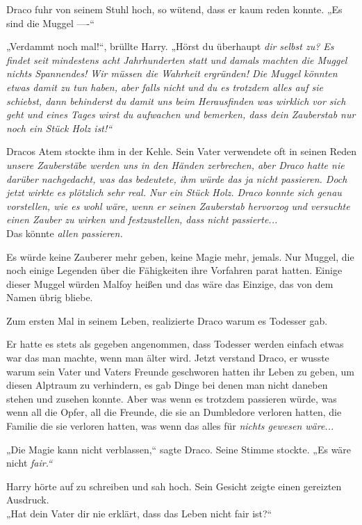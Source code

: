 {Draco fuhr von seinem Stuhl hoch, so wütend, dass er kaum reden konnte. „Es sind die Muggel ----“

„Verdammt noch mal!“, brüllte Harry. „Hörst du überhaupt \emph{dir selbst zu? Es findet seit mindestens acht Jahrhunderten statt und damals machten die Muggel nichts Spannendes! \emph{Wir müssen die Wahrheit} \emph{ergründen!} Die Muggel \emph{könnten} etwas damit zu tun haben, aber falls nicht und du es trotzdem alles auf sie schiebst, dann behinderst du damit uns beim Herausfinden was wirklich vor sich geht und eines Tages wirst du aufwachen und bemerken, dass dein Zauberstab nur noch ein Stück Holz ist!“}

Dracos Atem stockte ihm in der Kehle. Sein Vater verwendete oft in seinen Reden \emph{unsere Zauberstäbe werden uns in den Händen zerbrechen, aber Draco hatte nie darüber nachgedacht, was das bedeutete, \emph{ihm} würde das ja nicht passieren. Doch jetzt wirkte es plötzlich sehr real. \emph{Nur ein Stück Holz.} Draco konnte sich genau vorstellen, wie es wohl wäre, wenn er seinen Zauberstab hervorzog und versuchte einen Zauber zu wirken und festzustellen, dass nicht passierte...}\\ Das könnte \emph{allen passieren.}

Es würde keine Zauberer mehr geben, keine Magie mehr, jemals. Nur Muggel, die noch einige Legenden über die Fähigkeiten ihre Vorfahren parat hatten. Einige dieser Muggel würden Malfoy heißen und das wäre das Einzige, das von dem Namen übrig bliebe.

Zum ersten Mal in seinem Leben, realizierte Draco warum es Todesser gab.

Er hatte es stets als gegeben angenommen, dass Todesser werden einfach etwas war das man machte, wenn man älter wird. Jetzt verstand Draco, er wusste warum sein Vater und Vaters Freunde geschworen hatten ihr Leben zu geben, um diesen Alptraum zu verhindern, es gab Dinge bei denen man nicht daneben stehen und zusehen konnte. Aber was wenn es trotzdem passieren würde, was wenn all die Opfer, all die Freunde, die sie an Dumbledore verloren hatten, die Familie die sie verloren hatten, was wenn das alles für \emph{nicht\emph{s} gewesen wäre...}

„Die Magie kann nicht verblassen,“ sagte Draco. Seine Stimme stockte. „Es wäre nicht \emph{fair.“}

Harry hörte auf zu schreiben und sah hoch. Sein Gesicht zeigte einen gereizten Ausdruck.\\ „Hat dein Vater dir nie erklärt, dass das Leben nicht fair ist?“

}
